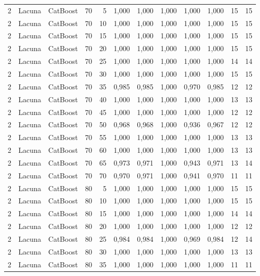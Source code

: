 \begin{longtable}{@{}rllrrrrrrrrr@{}}
2 & Lacuna & CatBoost & 70 & 5 & 1,000 & 1,000 & 1,000 & 1,000 & 1,000 & 15 & 15 \\
2 & Lacuna & CatBoost & 70 & 10 & 1,000 & 1,000 & 1,000 & 1,000 & 1,000 & 15 & 15 \\
2 & Lacuna & CatBoost & 70 & 15 & 1,000 & 1,000 & 1,000 & 1,000 & 1,000 & 15 & 15 \\
2 & Lacuna & CatBoost & 70 & 20 & 1,000 & 1,000 & 1,000 & 1,000 & 1,000 & 15 & 15 \\
2 & Lacuna & CatBoost & 70 & 25 & 1,000 & 1,000 & 1,000 & 1,000 & 1,000 & 14 & 14 \\
2 & Lacuna & CatBoost & 70 & 30 & 1,000 & 1,000 & 1,000 & 1,000 & 1,000 & 15 & 15 \\
2 & Lacuna & CatBoost & 70 & 35 & 0,985 & 0,985 & 1,000 & 0,970 & 0,985 & 12 & 12 \\
2 & Lacuna & CatBoost & 70 & 40 & 1,000 & 1,000 & 1,000 & 1,000 & 1,000 & 13 & 13 \\
2 & Lacuna & CatBoost & 70 & 45 & 1,000 & 1,000 & 1,000 & 1,000 & 1,000 & 12 & 12 \\
2 & Lacuna & CatBoost & 70 & 50 & 0,968 & 0,968 & 1,000 & 0,936 & 0,967 & 12 & 12 \\
2 & Lacuna & CatBoost & 70 & 55 & 1,000 & 1,000 & 1,000 & 1,000 & 1,000 & 13 & 13 \\
2 & Lacuna & CatBoost & 70 & 60 & 1,000 & 1,000 & 1,000 & 1,000 & 1,000 & 13 & 13 \\
2 & Lacuna & CatBoost & 70 & 65 & 0,973 & 0,971 & 1,000 & 0,943 & 0,971 & 13 & 14 \\
2 & Lacuna & CatBoost & 70 & 70 & 0,970 & 0,971 & 1,000 & 0,941 & 0,970 & 11 & 11 \\
2 & Lacuna & CatBoost & 80 & 5 & 1,000 & 1,000 & 1,000 & 1,000 & 1,000 & 15 & 15 \\
2 & Lacuna & CatBoost & 80 & 10 & 1,000 & 1,000 & 1,000 & 1,000 & 1,000 & 15 & 15 \\
2 & Lacuna & CatBoost & 80 & 15 & 1,000 & 1,000 & 1,000 & 1,000 & 1,000 & 14 & 14 \\
2 & Lacuna & CatBoost & 80 & 20 & 1,000 & 1,000 & 1,000 & 1,000 & 1,000 & 12 & 12 \\
2 & Lacuna & CatBoost & 80 & 25 & 0,984 & 0,984 & 1,000 & 0,969 & 0,984 & 12 & 14 \\
2 & Lacuna & CatBoost & 80 & 30 & 1,000 & 1,000 & 1,000 & 1,000 & 1,000 & 13 & 13 \\
2 & Lacuna & CatBoost & 80 & 35 & 1,000 & 1,000 & 1,000 & 1,000 & 1,000 & 11 & 11 \\

\end{longtable}
